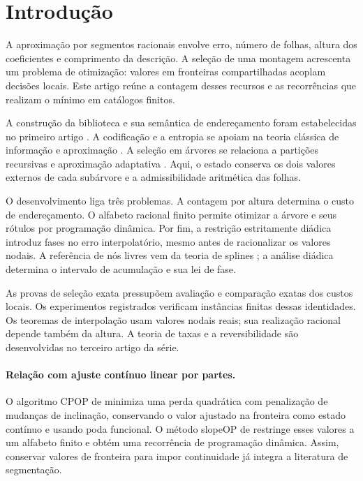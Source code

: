 \section{Introdução}
A aproximação por segmentos racionais envolve erro, número de folhas, altura dos coeficientes e comprimento da descrição. A seleção de uma montagem acrescenta um problema de otimização: valores em fronteiras compartilhadas acoplam decisões locais. Este artigo reúne a contagem desses recursos e as recorrências que realizam o mínimo em catálogos finitos.

A construção da biblioteca e sua semântica de endereçamento foram estabelecidas no primeiro artigo \citep{artigo_2-oliveiraI}. A codificação e a entropia se apoiam na teoria clássica de informação e aproximação \citep{artigo_1-kolmogorov1959,artigo_1-elias1975,artigo_1-cohen2001,artigo_1-cover2006}. A seleção em árvores se relaciona a partições recursivas e aproximação adaptativa \citep{artigo_2-breiman1984,artigo_2-donoho1997,artigo_2-blanchard2007,artigo_1-binev2004}. Aqui, o estado conserva os dois valores externos de cada subárvore e a admissibilidade aritmética das folhas.

O desenvolvimento liga três problemas. A contagem por altura determina o custo de endereçamento. O alfabeto racional finito permite otimizar a árvore e seus rótulos por programação dinâmica. Por fim, a restrição estritamente diádica introduz fases no erro interpolatório, mesmo antes de racionalizar os valores nodais. A referência de nós livres vem da teoria de splines \citep{artigo_1-deboor1973,artigo_1-burchard1974}; a análise diádica determina o intervalo de acumulação e sua lei de fase.

As provas de seleção exata pressupõem avaliação e comparação exatas dos custos locais. Os experimentos registrados verificam instâncias finitas dessas identidades. Os teoremas de interpolação usam valores nodais reais; sua realização racional depende também da altura. A teoria de taxas e a reversibilidade são desenvolvidas no terceiro artigo da série.

\paragraph{Relação com ajuste contínuo linear por partes.}
O algoritmo CPOP de \citet{artigo_2-fearnhead2019} minimiza uma perda quadrática com penalização de mudanças de inclinação, conservando o valor ajustado na fronteira como estado contínuo e usando poda funcional. O método slopeOP de \citet{artigo_2-runge2022} restringe esses valores a um alfabeto finito e obtém uma recorrência de programação dinâmica. Assim, conservar valores de fronteira para impor continuidade já integra a literatura de segmentação.

